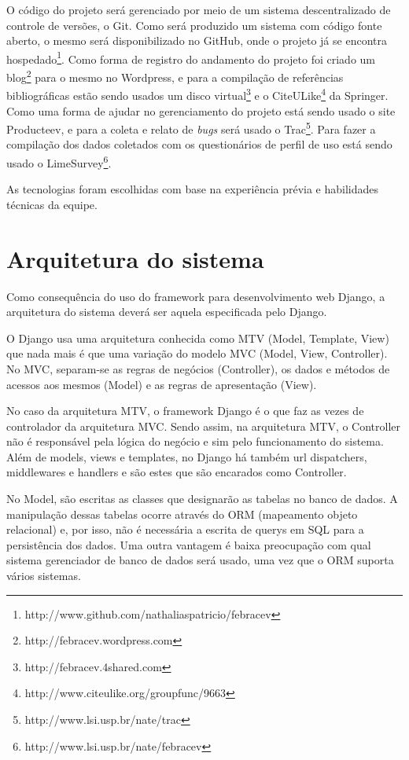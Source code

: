   O código do projeto será gerenciado por meio de um sistema descentralizado de controle de versões, o Git. Como será produzido um sistema com código fonte aberto, o mesmo será disponibilizado no GitHub, onde o projeto já se encontra hospedado\footnote{http://www.github.com/nathaliaspatricio/febracev}. Como forma de registro do andamento do projeto foi criado um blog\footnote{http://febracev.wordpress.com} para o mesmo no Wordpress, e para a compilação de referências bibliográficas estão sendo usados um disco virtual\footnote{http://febracev.4shared.com} e o CiteULike\footnote{http://www.citeulike.org/groupfunc/9663} da Springer. Como uma forma de ajudar no gerenciamento do projeto está sendo usado o site Producteev, e para a coleta e relato de \textit{bugs} será usado o Trac\footnote{http://www.lsi.usp.br/nate/trac}. Para fazer a compilação dos dados coletados com os questionários de perfil de uso está sendo usado o LimeSurvey\footnote{http://www.lsi.usp.br/nate/febracev}.

  As tecnologias foram escolhidas com base na experiência prévia e habilidades técnicas da equipe.

\section{Arquitetura do sistema}

  Como consequência do uso do framework para desenvolvimento web Django, a arquitetura do sistema deverá ser aquela especificada pelo Django.

  O Django usa uma arquitetura conhecida como MTV (Model, Template, View) que nada mais é que uma variação do modelo MVC (Model, View, Controller). No MVC, separam-se as regras de negócios (Controller), os dados e métodos de acessos aos mesmos (Model) e as regras de apresentação (View).

  No caso da arquitetura MTV, o framework Django é o que faz as vezes de controlador da arquitetura MVC. Sendo assim, na arquitetura MTV, o Controller não é responsável pela lógica do negócio e sim pelo funcionamento do sistema. Além de models, views e templates, no Django há também url dispatchers, middlewares e handlers e são estes que são encarados como Controller.

  No Model, são escritas as classes que designarão as tabelas no banco de dados. A manipulação dessas tabelas ocorre através do ORM (mapeamento objeto relacional) e, por isso, não é necessária a escrita de querys em SQL para a persistência dos dados. Uma outra vantagem é baixa preocupação com qual sistema gerenciador de banco de dados será usado, uma vez que o ORM suporta vários sistemas.

